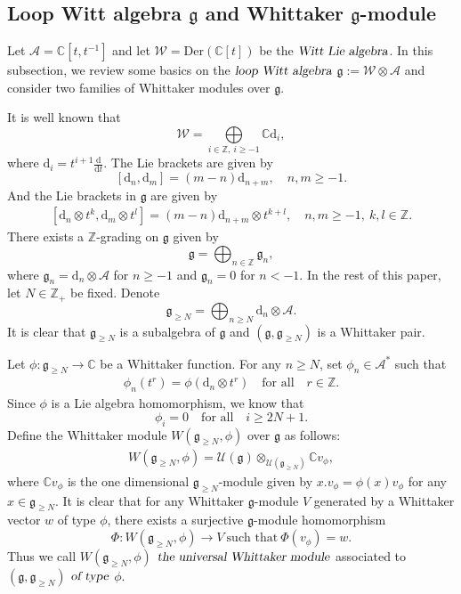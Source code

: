 \documentclass[12pt, a4paper]{amsart}
\newcommand{\fg}{\mathfrak g}
\newcommand{\C}{\mathbb{C}}
\newcommand{\Z}{\mathbb Z}
\newcommand{\rd}{\mathrm{d}}
\newcommand{\U}{\mathcal{U}}
\theoremstyle{Theorem}
\theoremstyle{Theorem}
\numberwithin{equation}{section}
\begin{document}
\subsection{Loop Witt algebra $\fg$ and Whittaker $\fg$-module}
Let $\mathcal{A}=\C[t,t^{-1}]$ and let $\mathcal{W}=\text{Der}(\C[t])$ be
the $\textsl{Witt Lie algebra}$. In this subsection, we review some basics on the $\textsl{loop Witt algebra}$
$\fg:=\mathcal{W}\otimes\mathcal{A}$ and consider two families of Whittaker modules over $\fg$.

It is well known that \[\mathcal{W}=\underset{i\in\Z,\ i\geq-1 }{\bigoplus}\C \rd_{i},\]
where $\rd_{i}=t^{i+1}\frac{\rd}{\rd t}$. The Lie brackets are given by
\[[\rd_{n},\rd_{m}]=(m-n)\rd_{n+m},\quad n,m\geq-1.\]
And the Lie brackets in $\fg$ are given by
\begin{align}\label{Lie-bracket}[\rd_{n}\otimes t^{k},\rd_{m}\otimes t^{l}]=(m-n)\rd_{n+m}\otimes t^{k+l},\quad n,m\geq-1,\ k,l\in\Z.\end{align}
There exists a $\Z$-grading on $\fg$ given by
\[\fg=\bigoplus_{n\in\Z}\fg_{n},\]
where $\fg_{n}=\rd_{n}\otimes\mathcal{A}$ for $n\geq-1$ and $\fg_{n}=0$ for $n<-1$.
In the rest of this paper, let $N\in\Z_{+}$ be fixed. Denote
\[\fg_{\geq N}=\bigoplus_{n\geq N}\rd_{n}\otimes\mathcal{A}.\]
It is clear that $\fg_{\geq N}$ is a subalgebra of $\fg$ and $(\fg,\fg_{\geq N})$ is a Whittaker pair.

Let $\phi:\fg_{\geq N}\rightarrow\C$ be a Whittaker function. For any $n\geq N$,
set $\phi_{n}\in\mathcal{A}^*$ such that
\begin{align}\label{psi-n}\phi_{n}(t^{r})=\phi(\rd_{n}\otimes t^{r})\quad \text{for all}\quad r\in\Z.\end{align}
Since $\phi$ is a Lie algebra homomorphism, we know that
\[\phi_{i}=0\quad\text{for all}\quad i\geq2N+1.\] Define the Whittaker module
$W(\fg_{\geq N},\phi)$ over $\fg$ as follows:
\begin{align}\label{Universal-Whittaker-mod}
W(\fg_{\geq N},\phi)=\U(\fg)\otimes_{\U(\fg_{\geq N})}\C v_{\phi},
\end{align}
where $\C v_{\phi}$ is the one dimensional $\fg_{\geq N}$-module given by
$x.v_{\phi}=\phi(x)v_{\phi}$ for any $x\in\fg_{\geq N}$. It is clear that for any Whittaker
$\fg$-module $V$ generated by a Whittaker vector $w$ of type $\phi$, there exists a surjective $\fg$-module
homomorphism \[\Phi: W(\fg_{\geq N},\phi)\rightarrow V\ \text{such that}\ \Phi(v_{\phi})=w.\]
Thus we call $W(\fg_{\geq N},\phi)$
$\textsl{the universal Whittaker module}$ associated to $(\fg,\fg_{\geq N})$ $\textsl{of type}$ $\phi$.
\end{document}
